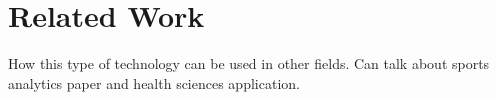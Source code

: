 \chapter{Related Work}\label{ch:related_work}

How this type of technology can be used in other fields. Can talk about sports analytics paper and health sciences application.
